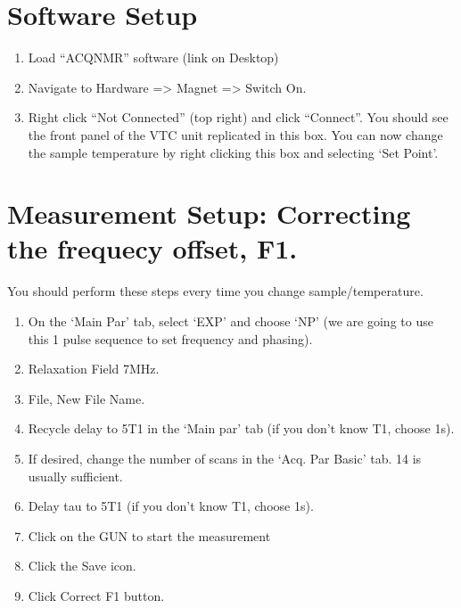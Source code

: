 \documentclass[letterpaper,10pt,english]{sphinxmanual}
\begin{document}
\section{Software Setup}
\label{\detokenize{stelar-ffc:software-setup}}\begin{enumerate}
%
\item {} 
\sphinxAtStartPar
Load “ACQNMR” software (link on Desktop)

\item {} 
\sphinxAtStartPar
Navigate to Hardware =\textgreater{} Magnet =\textgreater{} Switch On.

\item {} 
\sphinxAtStartPar
Right click “Not Connected” (top right) and click “Connect”. You should see the front panel of the VTC unit replicated in this box. You can now change the sample temperature by right clicking this box and selecting ‘Set Point’.

\end{enumerate}


\section{Measurement Setup: Correcting the frequecy offset, F1.}
\label{\detokenize{stelar-ffc:measurement-setup-correcting-the-frequecy-offset-f1}}
\sphinxAtStartPar
You should perform these steps every time you change sample/temperature.
\begin{enumerate}
%
\item {} 
\sphinxAtStartPar
On the ‘Main Par’ tab, select ‘EXP’ and choose ‘NP’ (we are going to use this 1 pulse sequence to set frequency and phasing).

\item {} 
\sphinxAtStartPar
Relaxation Field 7MHz.

\item {} 
\sphinxAtStartPar
File, New File Name.

\item {} 
\sphinxAtStartPar
Recycle delay to 5T1 in the ‘Main par’ tab (if you don’t know T1, choose 1s).

\item {} 
\sphinxAtStartPar
If desired, change the number of scans in the ‘Acq. Par \textendash{} Basic’ tab. 1\sphinxhyphen{}4 is usually sufficient.

\item {} 
\sphinxAtStartPar
Delay tau to 5T1 (if you don’t know T1, choose 1s).

\item {} 
\sphinxAtStartPar
Click on the GUN to start the measurement

\item {} 
\sphinxAtStartPar
Click the Save icon.

\item {} 
\sphinxAtStartPar
Click Correct F1 button.

\end{enumerate}
\end{document}
